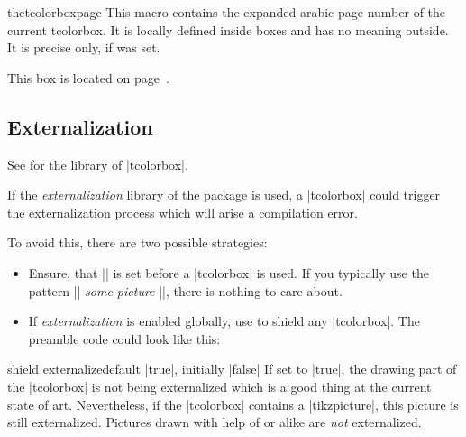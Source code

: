 \begin{docCommand}[doc new=2015-11-13]{thetcolorboxpage}{}
This macro contains the expanded arabic page number of the current tcolorbox.
It is locally defined inside boxes and has no meaning outside.
It is precise only, if  was set.

\begin{dispExample}
\begin{tcolorbox}[colback=yellow!5,check odd page,
    title=Box on page~\thetcolorboxpage]
  This box is located on page~\thetcolorboxpage.
\end{tcolorbox}
\end{dispExample}
\end{docCommand}





\clearpage
\subsection{Externalization}
\begin{marker}
See  for the  library of |tcolorbox|.
\end{marker}

If the \emph{externalization} library of the  package is used,
a |tcolorbox| could trigger the externalization process which will arise
a compilation error.

To avoid this, there are two possible strategies:
\begin{itemize}
\item Ensure, that |\tikzexternaldisable| is set before a |tcolorbox| is used.
  If you typically use the pattern |\tikzexternalenable| \textit{some picture} |\tikzexternaldisable|,
  there is nothing to care about.
\item If \emph{externalization} is enabled globally, use  to
  shield any |tcolorbox|. The preamble code could look like this:
\begin{dispListing}
\usetikzlibrary{external}
\tikzexternalize
{}
\end{dispListing}
\end{itemize}

\begin{docTcbKey}{shield externalize}{}{default |true|, initially |false|}
If set to |true|, the drawing part of the |tcolorbox| is not being externalized
which is a good thing at the current state of art. Nevertheless, if the
|tcolorbox| contains a |tikzpicture|, this picture is still externalized.
Pictures drawn with help of  or alike are \emph{not}
externalized.
\end{docTcbKey}

